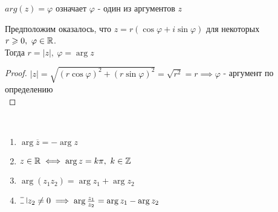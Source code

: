 \begin{defn}
    $arg(z) = \varphi$ означает $\varphi$ - один из аргументов $z$
\end{defn}

\begin{notice}
    Предположим оказалось, что $z = r(\cos\varphi + i\sin\varphi)$ для некоторых $r \geqslant 0,~\varphi \in \mathbb{R}$.\\
    Тогда $r = |z|,~\varphi = \arg z$
\end{notice}

\begin{proof}
    $|z| = \sqrt{(r\cos\varphi)^2 + (r\sin\varphi)^2} = \sqrt{r^2} = r \implies \varphi$ - аргумент по определению\\
\end{proof}

\begin{theorem-non}~
    \begin{enumerate}
        \item $\arg \overline{z} = -\arg z$
        \item $z \in \mathbb{R} \iff \arg z = k \pi,~k \in \mathbb{Z}$
        \item $\arg(z_1 z_2) = \arg z_1 + \arg z_2$
        \item $\letus z_2 \neq 0 \implies \arg \frac{z_1}{z_2} = \arg z_1 - \arg z_2$
    \end{enumerate}
\end{theorem-non}

